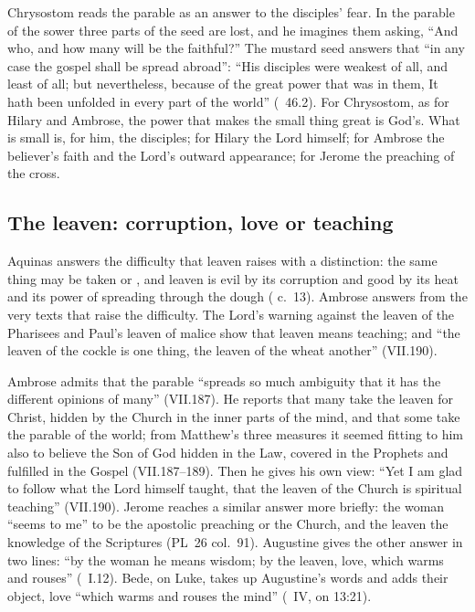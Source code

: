 Chrysostom reads the parable as an answer to the disciples' fear. In the
parable of the sower three parts of the seed are lost, and he imagines them
asking, ``And who, and how many will be the faithful?'' The mustard seed
answers that ``in any case the gospel shall be spread abroad'': ``His
disciples were weakest of all, and least of all; but nevertheless, because of
the great power that was in them, It hath been unfolded in every part of the
world'' (~46.2). For Chrysostom, as for Hilary and Ambrose,
the power that makes the small thing great is God's. What is small is, for
him, the disciples; for Hilary the Lord himself; for Ambrose the
believer's faith and the Lord's outward appearance; for Jerome the preaching
of the cross.

\subsection{The leaven: corruption, love or teaching}

Aquinas answers the difficulty that leaven raises with a distinction: the same
thing may be taken  or , and leaven is evil by
its corruption and good by its heat and its power of spreading through the
dough ( c.~13). Ambrose answers from the very
texts that raise the difficulty. The Lord's warning against the leaven of the
Pharisees and Paul's leaven of malice show that leaven means teaching; and
``the leaven of the cockle is one thing, the leaven of the wheat another''
(VII.190).

Ambrose admits that the parable ``spreads so much ambiguity that it has the
different opinions of many'' (VII.187). He reports that many take the leaven
for Christ, hidden by the Church in the inner parts of the mind, and that some
take the parable of the world; from Matthew's three measures it seemed fitting
to him also to believe the Son of God hidden in the Law, covered in the
Prophets and fulfilled in the Gospel (VII.187--189). Then he gives his own
view: ``Yet I am glad to follow what the Lord himself taught, that the leaven
of the Church is spiritual teaching'' (VII.190). Jerome reaches a similar
answer more briefly: the woman ``seems to me'' to be the apostolic preaching or
the Church, and the leaven the knowledge of the Scriptures (PL~26 col.~91).
Augustine gives the other answer in two lines: ``by the woman he means wisdom;
by the leaven, love, which warms and rouses'' (~I.12). Bede, on Luke, takes up Augustine's words and adds their
object, love ``which warms and rouses the mind'' (~IV, on
13:21).

